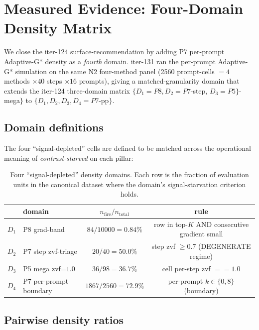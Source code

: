 \section{Measured Evidence: Four-Domain Density Matrix}
\label{sec:synth-four-domain}

We close the iter-124 surface-recommendation by adding P7 per-prompt
Adaptive-G* density as a \emph{fourth} domain. iter-131 ran the
per-prompt Adaptive-G* simulation on the same N2 four-method panel
(\num{2560} prompt-cells $= 4$ methods $\times 40$ steps $\times
16$ prompts), giving a matched-granularity domain that extends the
iter-124 three-domain matrix $\{D_1{=}P8, D_2{=}P7$-step,
$D_3{=}P5\}$-mega$\}$ to $\{D_1, D_2, D_3, D_4{=}P7$-pp$\}$.

\subsection{Domain definitions}

The four ``signal-depleted'' cells are defined to be matched across the
operational meaning of \emph{contrast-starved} on each pillar:

\begin{table}[h]
\centering\small
\caption{Four ``signal-depleted'' density domains. Each row is the
fraction of evaluation units in the canonical dataset where the
domain's signal-starvation criterion holds.}
\label{tab:synth-four-domain}
\begin{tabular}{llcc}
\toprule
& domain & $n_{\mathrm{fire}} / n_{\mathrm{total}}$ & rule \\
\midrule
$D_1$ & P8 grad-band        & $84 / 10000 = 0.84\%$ & row in top-$K$ AND consecutive gradient small \\
$D_2$ & P7 step zvf-triage  & $20 / 40 = 50.0\%$    & step zvf $\geq 0.7$ (DEGENERATE regime) \\
$D_3$ & P5 mega zvf=$1.0$   & $36 / 98 = 36.7\%$    & cell per-step zvf $== 1.0$ \\
$D_4$ & P7 per-prompt boundary & $1867 / 2560 = 72.9\%$ & per-prompt $k \in \{0, 8\}$ (boundary) \\
\bottomrule
\end{tabular}
\end{table}

\subsection{Pairwise density ratios}

